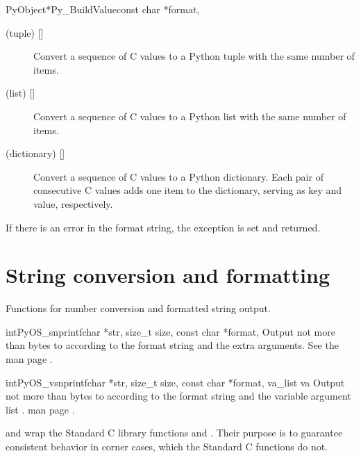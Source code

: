 \begin{cfuncdesc}{PyObject*}{Py_BuildValue}{const char *format,
                                            \moreargs}
\begin{description}
    \item[ (tuple) {[]}]
    Convert a sequence of C values to a Python tuple with the same
    number of items.

    \item[ (list) {[]}]
    Convert a sequence of C values to a Python list with the same
    number of items.

    \item[ (dictionary) {[]}]
    Convert a sequence of C values to a Python dictionary.  Each pair
    of consecutive C values adds one item to the dictionary, serving
    as key and value, respectively.

  \end{description}

  If there is an error in the format string, the
   exception is set and \NULL{} returned.
\end{cfuncdesc}

\section{String conversion and formatting \label{string-formatting}}

Functions for number conversion and formatted string output.

\begin{cfuncdesc}{int}{PyOS_snprintf}{char *str, size_t size, 
                                      const char *format, \moreargs}
Output not more than  bytes to  according to the format
string  and the extra arguments. See the \UNIX{} man
page .
\end{cfuncdesc}

\begin{cfuncdesc}{int}{PyOS_vsnprintf}{char *str, size_t size,
                                       const char *format, va_list va}
Output not more than  bytes to  according to the format
string  and the variable argument list . \UNIX{}
man page .
\end{cfuncdesc}

 and  wrap the
Standard C library functions  and
. Their purpose is to guarantee consistent
behavior in corner cases, which the Standard C functions do not.

